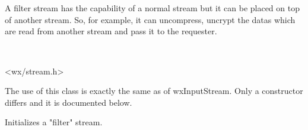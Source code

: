 \section{}\label{wxfilterinputstream}

A filter stream has the capability of a normal stream but it can be placed on top
of another stream. So, for example, it can uncompress, uncrypt the datas which are read
from another stream and pass it to the requester.


\\


<wx/stream.h>


The use of this class is exactly the same as of wxInputStream. Only a constructor
differs and it is documented below.



Initializes a "filter" stream.

